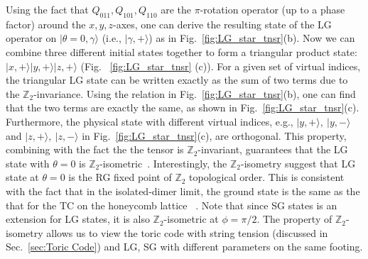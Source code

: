 \documentclass{ntuthesis}
\newcommand{\citep}{\cite}
\begin{document}
%
Using the fact that $Q_{011}, Q_{101}, Q_{110}$ are  the $\pi$-rotation operator (up to a phase factor) around the $x, y, z$-axes, one can derive the resulting state of the LG operator on $|\theta = 0, \gamma \rangle$ (i.e., $|\gamma,+\rangle$) as in  Fig.~\ref{fig:LG_star_tnsr}(b).
%
Now we can combine three different initial states together to form a triangular product state: $|x,+\rangle |y,+ \rangle |z,+ \rangle $ (Fig. ~\ref{fig:LG_star_tnsr} (c)).
%
For a given set of virtual indices,   the triangular LG state can be written exactly as the sum of two terms due to the $\mathbb{Z}_2$-invariance. 
%
Using the relation in Fig.~\ref{fig:LG_star_tnsr}(b), one can find that the two terms are exactly the same, as shown in Fig.~\ref{fig:LG_star_tnsr}(c). 
%
Furthermore, the physical state with different virtual indices, e.g., $|y,+\rangle,\ |y,- \rangle$ and $|z,+\rangle,\ |z,- \rangle$ in Fig.~\ref{fig:LG_star_tnsr}(c), are orthogonal.
%
This property, combining with the fact the the tensor is $\mathbb{ Z}_2$-invariant, guarantees that the LG state with $\theta = 0$ is $\mathbb{ Z}_2$-isometric~\citep{2011_Norbert_Ginjective}. 
%
Interestingly, the $\mathbb{ Z}_2$-isometry suggest that LG state at $\theta = 0$ is the RG fixed point of $\mathbb{Z}_2$ topological order. 
%
This is consistent with the fact that in the  isolated-dimer limit, the ground state is the same as the that for the TC on the honeycomb lattice ~\citep{KSL_perturbative}. 
%
Note that since SG states is an extension for LG states, it is also $\mathbb{ Z}_2$-isometric at $\phi = \pi/2$. 
%
The property of $\mathbb{ Z}_2 $-isometry allows us to view the toric code with string tension (discussed in Sec.~\ref{sec:Toric Code}) and LG, SG with different parameters on the same footing.
\end{document}
